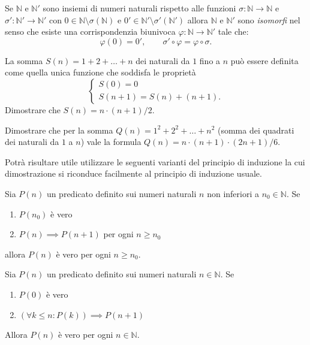 \documentclass[italian,a4paper,twosides,headinclude]{scrbook}
\renewcommand{\phi}{\varphi}
\newcommand{\NN}{\mathbb N}
\begin{document}
\begin{theorem}
Se $\NN$ e $\NN'$ sono insiemi di numeri naturali rispetto alle
funzioni $\sigma\colon \NN \to \NN$ e $\sigma'\colon \NN'\to \NN'$
con $0\in \NN\setminus\sigma(\NN)$ e $0'\in \NN'\setminus\sigma'(\NN')$
allora $\NN$ e $\NN'$ sono \emph{isomorfi} nel senso che esiste una
corrispondenzia biunivoca $\phi\colon \NN \to \NN'$ tale che:
\[
  \phi(0) = 0', \qquad \sigma'\circ \phi = \phi\circ \sigma.
\]
\end{theorem}


\begin{exercise}
La somma $S(n) = 1 + 2 + \dots +n$
dei naturali da $1$ fino a $n$ può essere definita come quella unica funzione
che soddisfa le proprietà
\[
\begin{cases}
  S(0) = 0 \\
  S(n+1) = S(n) + (n+1).
\end{cases}
\]
Dimostrare che $S(n) = n \cdot (n+1) / 2$.
\end{exercise}

\begin{exercise}
Dimostrare che per la somma
$Q(n) = 1^2 + 2^2 + \dots + n^2$
(somma dei quadrati dei naturali da $1$ a $n$)
vale la formula
$Q(n) = n \cdot (n+1)\cdot (2n + 1) / 6$.
\end{exercise}

Potrà risultare utile utilizzare le seguenti varianti del principio di
induzione la cui dimostrazione si riconduce facilmente al principio di induzione usuale.
\begin{theorem}
Sia $P(n)$ un predicato definito sui numeri naturali $n$
non inferiori a $n_0\in \NN$.
Se
\begin{enumerate}
\item $P(n_0)$ è vero
\item $P(n) \implies P(n+1)$ per ogni $n\ge n_0$
\end{enumerate}
allora $P(n)$ è vero per ogni $n\ge n_0$.
\end{theorem}

\begin{theorem}
Sia $P(n)$ un predicato definito sui numeri naturali $n\in \NN$.
Se
\begin{enumerate}
\item $P(0)$ è vero
\item $(\forall k\le n\colon P(k))\implies P(n+1)$
\end{enumerate}
Allora $P(n)$ è vero per ogni $n\in \NN$.
\end{theorem}
\end{document}
